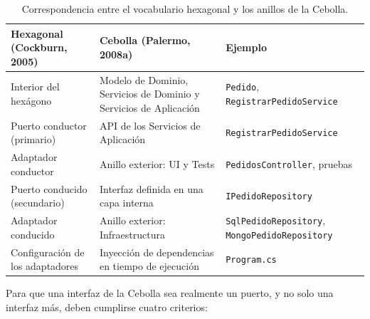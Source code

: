 \documentclass[11pt,a4paper]{article}
\begin{document}
\begin{table}[htbp]
\centering
\small
\renewcommand{\arraystretch}{1.25}
\begin{tabularx}{\linewidth}{@{}LLL@{}}
\toprule
\textbf{Hexagonal (Cockburn, 2005)} & \textbf{Cebolla (Palermo, 2008a)} & \textbf{Ejemplo} \\
\midrule
Interior del hexágono & Modelo de Dominio, Servicios de Dominio y Servicios de Aplicación & \texttt{Pedido}, \texttt{RegistrarPedidoService} \\
\addlinespace
Puerto conductor (primario) & API de los Servicios de Aplicación & \texttt{RegistrarPedidoService} \\
\addlinespace
Adaptador conductor & Anillo exterior: UI y Tests & \texttt{PedidosController}, pruebas \\
\addlinespace
Puerto conducido (secundario) & Interfaz definida en una capa interna & \texttt{IPedidoRepository} \\
\addlinespace
Adaptador conducido & Anillo exterior: Infraestructura & \texttt{SqlPedidoRepository}, \texttt{MongoPedidoRepository} \\
\addlinespace
Configuración de los adaptadores & Inyección de dependencias en tiempo de ejecución & \texttt{Program.cs} \\
\bottomrule
\end{tabularx}
\caption{Correspondencia entre el vocabulario hexagonal y los anillos de la Cebolla.}
\label{tab:correspondencia}
\end{table}

Para que una interfaz de la Cebolla sea realmente un puerto, y no solo una interfaz más, deben
cumplirse cuatro criterios:
\end{document}
